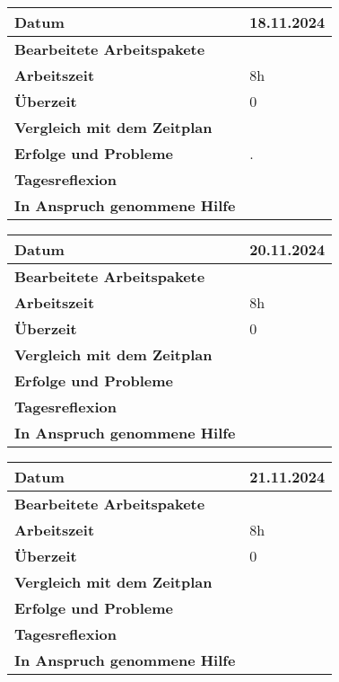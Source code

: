 \begin{longtable}{p{}|p{}}
	\hline
	\textbf{Datum}                       & 18.11.2024 \\
	\hline
	\textbf{Bearbeitete Arbeitspakete}   & \\
	\hline
	\textbf{Arbeitszeit}                 & 8h \\
	\hline
	\textbf{Überzeit}                    & 0 \\
	\hline
	\textbf{Vergleich mit dem Zeitplan}  & \\
	\hline
	\textbf{Erfolge und Probleme}        & .
	\\
	\hline
	\textbf{Tagesreflexion}              & 
	\\
	\hline
	\textbf{In Anspruch genommene Hilfe} & \\
	\hline
\end{longtable}\label{tab:arbeitsprotokoll-tag8}
\newpage

\begin{longtable}{p{}|p{}}
	\hline
	\textbf{Datum}                       & 20.11.2024 \\
	\hline
	\textbf{Bearbeitete Arbeitspakete}   & \\
	\hline
	\textbf{Arbeitszeit}                 & 8h \\
	\hline
	\textbf{Überzeit}                    & 0 \\
	\hline
	\textbf{Vergleich mit dem Zeitplan}  & \\
	\hline
	\textbf{Erfolge und Probleme}        & 
	\\
	\hline
	\textbf{Tagesreflexion}              &
	\\
	\hline
	\textbf{In Anspruch genommene Hilfe} & \\
	\hline
\end{longtable}\label{tab:arbeitsprotokoll-tag9}
\newpage

\begin{longtable}{p{}|p{}}
	\hline
	\textbf{Datum}                       & 21.11.2024 \\
	\hline
	\textbf{Bearbeitete Arbeitspakete}   &  \\
	\hline
	\textbf{Arbeitszeit}                 & 8h \\
	\hline
	\textbf{Überzeit}                    & 0 \\
	\hline
	\textbf{Vergleich mit dem Zeitplan}  & 
	\\
	\hline
	\textbf{Erfolge und Probleme}        & 
	\\
	\hline
	\textbf{Tagesreflexion}              & 
	\\
	\hline
	\textbf{In Anspruch genommene Hilfe} & \\
	\hline
\end{longtable}\label{tab:arbeitsprotokoll-tag10}
\newpage


